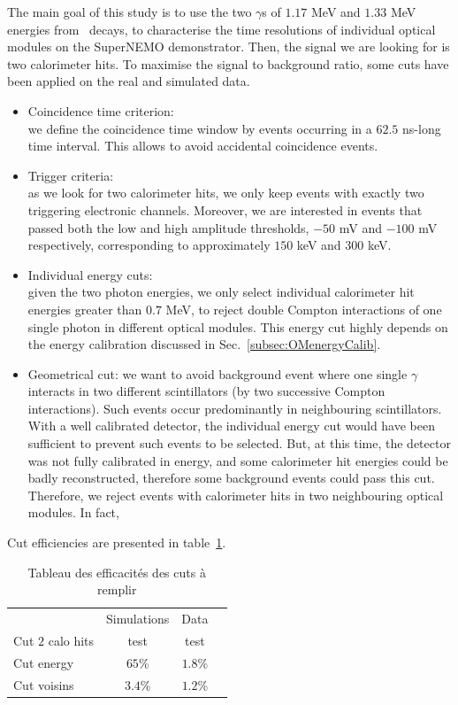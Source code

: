 The main goal of this study is to use the two $\gamma$s of $1.17$ MeV and $1.33$ MeV energies from \Co\ decays, to characterise the time resolutions of individual optical modules on the SuperNEMO demonstrator.
Then, the signal we are looking for is two calorimeter hits.
To maximise the signal to background ratio, some cuts have been applied on the real and simulated data.
\begin{itemize}
\item Coincidence time criterion:\\ we define the coincidence time window by events occurring in a $62.5$ ns-long time interval.
  This allows to avoid accidental coincidence events.
\item Trigger criteria:\\ as we look for two calorimeter hits, we only keep events with exactly two triggering electronic channels.
  Moreover, we are interested in events that passed both the low and high amplitude thresholds, $-50$ mV and $-100$ mV respectively, corresponding to approximately $150$ keV and $300$ keV.
\item Individual energy cuts:\\ given the two photon energies, we only select individual calorimeter hit energies greater than $0.7$ MeV, to reject double Compton interactions of one single photon in different optical modules.
  This energy cut highly depends on the energy calibration discussed in Sec.~\ref{subsec:OMenergyCalib}.
\item Geometrical cut:
  we want to avoid background event where one single $\gamma$ interacts in two different scintillators (by two successive Compton interactions).
  Such events occur predominantly in neighbouring scintillators.
  With a well calibrated detector, the individual energy cut would have been sufficient to prevent such events to be selected.
  But, at this time, the detector was not fully calibrated in energy, and some calorimeter hit energies could be badly reconstructed, therefore some background events could pass this cut.
  Therefore, we reject events with calorimeter hits in two neighbouring optical modules.
  In fact,
\end{itemize}

Cut efficiencies are presented in table~\ref{tab:Co_cut_eff}.
\begin{table}[h]
  \centering

  \begin{tabular}{ l c c c }
    & Simulations & Data \\
    Cut $2$ calo hits & test & test \\
    Cut energy & $65$\% & $1.8$\% \\
    Cut voisins & $3.4$\% & $1.2$\% \\
  \end{tabular}
  \caption{Tableau des efficacités des cuts à remplir
    \label{tab:Co_cut_eff}}
\end{table}



